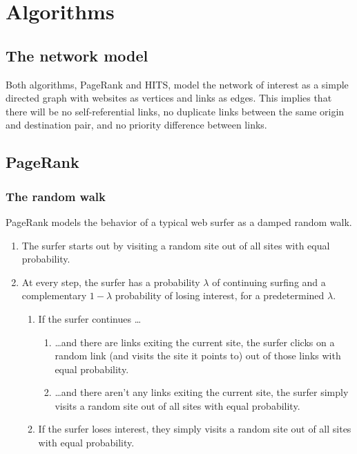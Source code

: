 \documentclass[12pt, titlepage, twoside]{amsart}
\begin{document}
\section{Algorithms}

\subsection{The network model}

Both algorithms, PageRank and HITS, model the network of interest as a simple directed graph with websites as vertices
and links as edges.
This implies that there will be no self-referential links, no duplicate links between the same origin
and destination pair, and no priority difference between links.

\subsection{PageRank}

\subsubsection{The random walk}

PageRank models the behavior of a typical web surfer as a damped random walk.

\begin{enumerate}
  \item The surfer starts out by visiting a random site out of all sites with equal probability.
  \item At every step, the surfer has a probability $\lambda$ of continuing surfing and a complementary
    $1 - \lambda$ probability of losing interest, for a predetermined $\lambda$.
  
    \begin{enumerate}
      \item If the surfer continues \ldots

        \begin{enumerate}
          \item \ldots and there are links exiting the current site, the surfer
            clicks on a random link (and visits the site it points to) out of those links with equal probability.
          \item \ldots and there aren't any links exiting the current site, the surfer simply
            visits a random site out of all sites with equal probability.
        \end{enumerate}

      \item If the surfer loses interest, they simply visits a random site out of all sites with equal probability.
    \end{enumerate}

\end{enumerate}
\end{document}
